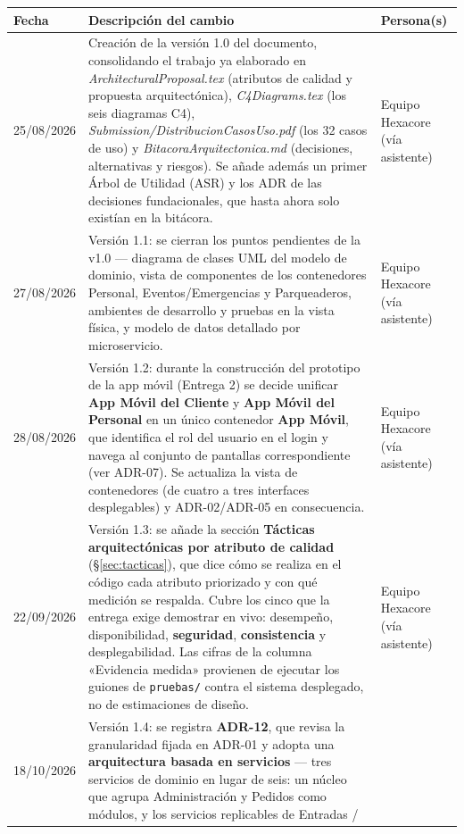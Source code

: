 \documentclass[11pt,a4paper]{article}
\begin{document}
\begin{center}
\begin{longtable}{|p{2.5cm}|p{7cm}|p{4cm}|}
\hline
\textbf{Fecha} & \textbf{Descripción del cambio} & \textbf{Persona(s)} \\
\hline
\endhead
25/08/2026 & Creación de la versión 1.0 del documento, consolidando el trabajo ya elaborado en
\textit{ArchitecturalProposal.tex} (atributos de calidad y propuesta arquitectónica),
\textit{C4Diagrams.tex} (los seis diagramas C4), \textit{Submission/DistribucionCasosUso.pdf} (los
32 casos de uso) y \textit{BitacoraArquitectonica.md} (decisiones, alternativas y riesgos). Se añade
además un primer Árbol de Utilidad (ASR) y los ADR de las decisiones fundacionales, que hasta
ahora solo existían en la bitácora. & Equipo Hexacore (vía asistente) \\
\hline
27/08/2026 & Versión 1.1: se cierran los puntos pendientes de la v1.0 — diagrama de clases UML
del modelo de dominio, vista de componentes de los contenedores Personal, Eventos/Emergencias y
Parqueaderos, ambientes de desarrollo y pruebas en la vista física, y modelo de datos detallado
por microservicio. & Equipo Hexacore (vía asistente) \\
\hline
28/08/2026 & Versión 1.2: durante la construcción del prototipo de la app móvil (Entrega 2) se
decide unificar \textbf{App Móvil del Cliente} y \textbf{App Móvil del Personal} en un único
contenedor \textbf{App Móvil}, que identifica el rol del usuario en el login y navega al conjunto
de pantallas correspondiente (ver ADR-07). Se actualiza la vista de contenedores (de cuatro a tres
interfaces desplegables) y ADR-02/ADR-05 en consecuencia. & Equipo Hexacore (vía asistente) \\
\hline
22/09/2026 & Versión 1.3: se añade la sección \textbf{Tácticas arquitectónicas por atributo de
calidad} (§\ref{sec:tacticas}), que dice cómo se realiza en el código cada atributo priorizado y
con qué medición se respalda. Cubre los cinco que la entrega exige demostrar en vivo: desempeño,
disponibilidad, \textbf{seguridad}, \textbf{consistencia} y desplegabilidad. Las cifras de la
columna «Evidencia medida» provienen de ejecutar los guiones de \texttt{pruebas/} contra el
sistema desplegado, no de estimaciones de diseño. & Equipo Hexacore (vía asistente) \\
\hline
18/10/2026 & Versión 1.4: se registra \textbf{ADR-12}, que revisa la granularidad fijada en ADR-01 y
adopta una \textbf{arquitectura basada en servicios} --- tres servicios de dominio en lugar de seis:
un núcleo que agrupa Administración y Pedidos como módulos, y los servicios replicables de Entradas /

\end{longtable}
\end{center}
\end{document}
